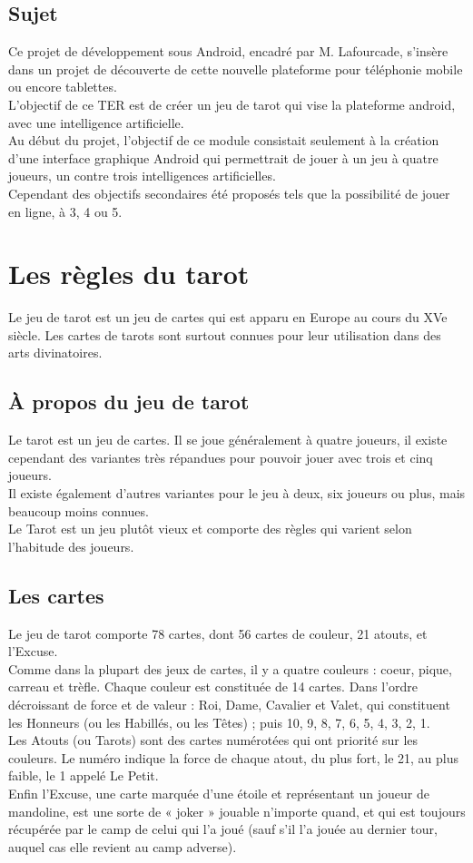 \documentclass[a4paper]{report}
\begin{document}
	\section{Sujet}
		Ce projet de développement sous Android, encadré par M. Lafourcade, s’insère dans un projet de découverte de cette nouvelle plateforme pour téléphonie mobile ou encore tablettes.\\
  		L'objectif de ce TER est de créer un jeu de tarot qui vise la plateforme android, avec une intelligence artificielle.\\
    		Au début du projet, l’objectif de ce module consistait seulement à la création d'une interface graphique Android qui permettrait de jouer à un jeu à quatre joueurs, un contre trois intelligences 			artificielles.\\
  		Cependant des objectifs secondaires été proposés tels que la possibilité de jouer en ligne, à 3, 4 ou 5.


\chapter{Les règles du tarot}
		Le jeu de tarot est un jeu de cartes qui est apparu en Europe au cours du XVe siècle. Les cartes de tarots sont surtout connues pour leur utilisation dans des arts divinatoires.
	\section{À propos du jeu de tarot}
		Le tarot est un jeu de cartes. Il se joue généralement à quatre joueurs, il existe cependant des variantes très répandues pour pouvoir jouer avec trois et cinq joueurs.\\
		Il existe également d’autres variantes pour le jeu à deux, six joueurs ou plus, mais beaucoup moins connues.\\
		Le Tarot est un jeu plutôt vieux et comporte des règles qui varient selon l’habitude des joueurs.\\

	\section{Les cartes}
		Le jeu de tarot comporte 78 cartes, dont 56 cartes de couleur, 21 atouts, et l’Excuse.\\
		Comme dans la plupart des jeux de cartes, il y a quatre couleurs : coeur, pique, carreau et trèfle. Chaque couleur est constituée de 14 cartes. Dans l'ordre décroissant de force et de 		valeur : Roi, Dame, Cavalier et Valet, qui constituent les Honneurs (ou les Habillés, ou les Têtes) ; puis 10, 9, 8, 7, 6, 5, 4, 3, 2, 1.\\
		Les Atouts (ou Tarots) sont des cartes numérotées qui ont priorité sur les couleurs. Le numéro indique la force de chaque atout, du plus fort, le 21, au plus faible, le 1 appelé 			Le Petit.\\
		Enfin l'Excuse, une carte marquée d'une étoile et représentant un joueur de mandoline, est une sorte de « joker » jouable n’importe quand, et qui est toujours récupérée par le 		camp de celui qui l’a joué (sauf s’il l’a jouée au dernier tour, auquel cas elle revient au camp adverse).\\
\end{document}
